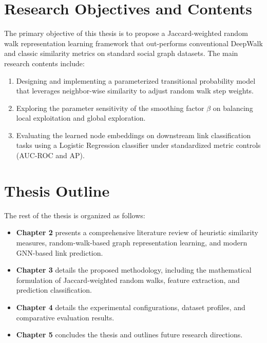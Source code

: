 \section{Research Objectives and Contents}

The primary objective of this thesis is to propose a Jaccard-weighted random walk representation learning framework that out-performs conventional DeepWalk and classic similarity metrics on standard social graph datasets. The main research contents include:
\begin{enumerate}
    \item Designing and implementing a parameterized transitional probability model that leverages neighbor-wise similarity to adjust random walk step weights.
    \item Exploring the parameter sensitivity of the smoothing factor $\beta$ on balancing local exploitation and global exploration.
    \item Evaluating the learned node embeddings on downstream link classification tasks using a Logistic Regression classifier under standardized metric controls (AUC-ROC and AP).
\end{enumerate}

\section{Thesis Outline}

The rest of the thesis is organized as follows:
\begin{itemize}
    \item \textbf{Chapter 2} presents a comprehensive literature review of heuristic similarity measures, random-walk-based graph representation learning, and modern GNN-based link prediction.
    \item \textbf{Chapter 3} details the proposed methodology, including the mathematical formulation of Jaccard-weighted random walks, feature extraction, and prediction classification.
    \item \textbf{Chapter 4} details the experimental configurations, dataset profiles, and comparative evaluation results.
    \item \textbf{Chapter 5} concludes the thesis and outlines future research directions.
\end{itemize}
